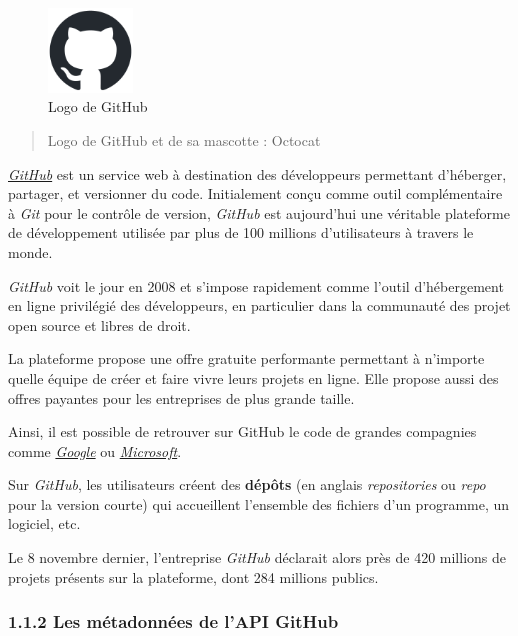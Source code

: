 \documentclass[
]{article}
\begin{document}
\begin{figure}
\centering
\includegraphics[width=0.2\textwidth,height=0.2\textheight]{./src/img/github-mark.png}
\caption{Logo de GitHub}
\end{figure}

\begin{quote}
Logo de GitHub et de sa mascotte : Octocat
\end{quote}

\href{https://github.com/}{\emph{GitHub}} est un service web à
destination des développeurs permettant d'héberger, partager, et
versionner du code. Initialement conçu comme outil complémentaire à
\emph{Git} pour le contrôle de version, \emph{GitHub} est aujourd'hui
une véritable plateforme de développement utilisée par plus de 100
millions d'utilisateurs à travers le monde.

\emph{GitHub} voit le jour en 2008 et s'impose rapidement comme l'outil
d'hébergement en ligne privilégié des développeurs, en particulier dans
la communauté des projet open source et libres de droit.

La plateforme propose une offre gratuite performante permettant à
n'importe quelle équipe de créer et faire vivre leurs projets en ligne.
Elle propose aussi des offres payantes pour les entreprises de plus
grande taille.

Ainsi, il est possible de retrouver sur GitHub le code de grandes
compagnies comme \href{https://github.com/google}{\emph{Google}} ou
\href{https://github.com/microsoft/}{\emph{Microsoft}}.

Sur \emph{GitHub}, les utilisateurs créent des \textbf{dépôts} (en
anglais \emph{repositories} ou \emph{repo} pour la version courte) qui
accueillent l'ensemble des fichiers d'un programme, un logiciel, etc.

Le 8 novembre dernier, l'entreprise \emph{GitHub} déclarait alors près
de 420 millions de projets présents sur la plateforme, dont 284 millions
publics.

\subsubsection{1.1.2 Les métadonnées de l'API
GitHub}\label{les-muxe9tadonnuxe9es-de-lapi-github}
\end{document}
